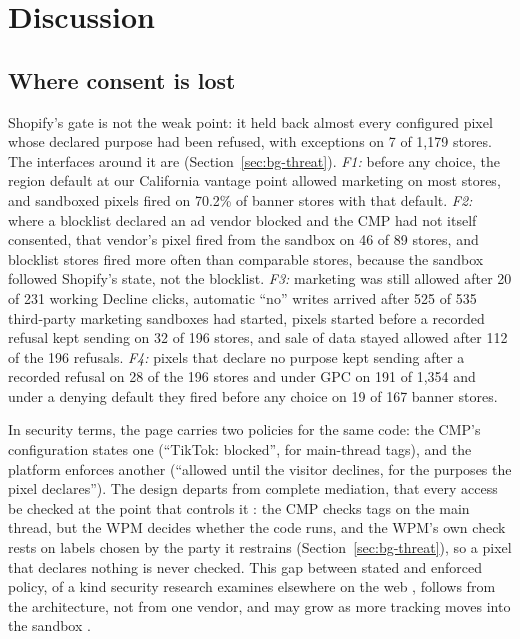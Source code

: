 \section{Discussion}\label{sec:discussion}

\subsection{Where consent is lost}\label{sec:disc-where}

Shopify's gate is not the weak point: it held back almost every configured pixel whose declared purpose had been refused, with exceptions on 7 of 1,179 stores. The interfaces around it are (Section~\ref{sec:bg-threat}). \emph{F1:} before any choice, the region default at our California vantage point allowed marketing on most stores, and sandboxed pixels fired on 70.2\% of banner stores with that default. \emph{F2:} where a blocklist declared an ad vendor blocked and the CMP had not itself consented, that vendor's pixel fired from the sandbox on 46 of 89 stores, and blocklist stores fired more often than comparable stores, because the sandbox followed Shopify's state, not the blocklist. \emph{F3:} marketing was still allowed after 20 of 231 working Decline clicks, automatic ``no'' writes arrived after 525 of 535 third-party marketing sandboxes had started, pixels started before a recorded refusal kept sending on 32 of 196 stores, and sale of data stayed allowed after 112 of the 196 refusals. \emph{F4:} pixels that declare no purpose kept sending after a recorded refusal on 28 of the 196 stores and under GPC on 191 of 1,354 and under a denying default they fired before any choice on 19 of 167 banner stores.

In security terms, the page carries two policies for the same code: the CMP's configuration states one (``TikTok: blocked'', for main-thread tags), and the platform enforces another (``allowed until the visitor declines, for the purposes the pixel declares''). The design departs from complete mediation, that every access be checked at the point that controls it \citep{saltzer1975protection}: the CMP checks tags on the main thread, but the WPM decides whether the code runs, and the WPM's own check rests on labels chosen by the party it restrains (Section~\ref{sec:bg-threat}), so a pixel that declares nothing is never checked. This gap between stated and enforced policy, of a kind security research examines elsewhere on the web \citep{latta2026policy}, follows from the architecture, not from one vendor, and may grow as more tracking moves into the sandbox \citep{shopify_checkout_upgrade}.

